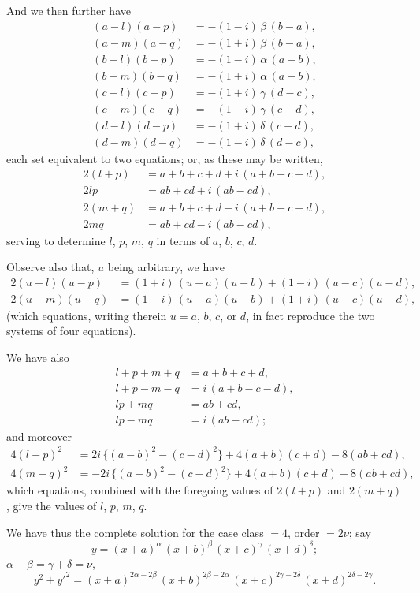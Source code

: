 \documentclass[12pt,a4paper]{article}
\theoremstyle{plain}
\begin{document}
And we then further have
\begin{align*}
(a - l)(a - p) &= -(1 - i)\,\beta\,(b - a), \\
(a - m)(a - q) &= -(1 + i)\,\beta\,(b - a), \\
(b - l)(b - p) &= -(1 - i)\,\alpha\,(a - b), \\
(b - m)(b - q) &= -(1 + i)\,\alpha\,(a - b), \\
(c - l)(c - p) &= -(1 + i)\,\gamma\,(d - c), \\
(c - m)(c - q) &= -(1 - i)\,\gamma\,(c - d), \\
(d - l)(d - p) &= -(1 + i)\,\delta\,(c - d), \\
(d - m)(d - q) &= -(1 - i)\,\delta\,(d - c),
\end{align*}
each set equivalent to two equations; or, as these may be written,
\begin{align*}
2(l + p) &= a + b + c + d + i\,(a + b - c - d), \\
2lp &= ab + cd + i\,(ab - cd), \\
2(m + q) &= a + b + c + d - i\,(a + b - c - d), \\
2mq &= ab + cd - i\,(ab - cd),
\end{align*}
serving to determine $l$, $p$, $m$, $q$ in terms of $a$, $b$, $c$, $d$.

Observe also that, $u$ being arbitrary, we have
\begin{align*}
2(u - l)(u - p) &= (1 + i)\,(u - a)(u - b) + (1 - i)\,(u - c)(u - d), \\
2(u - m)(u - q) &= (1 - i)\,(u - a)(u - b) + (1 + i)\,(u - c)(u - d),
\end{align*}
(which equations, writing therein $u = a$, $b$, $c$, or $d$, in fact reproduce the two systems of four equations).

We have also
\begin{align*}
l + p + m + q &= a + b + c + d, \\
l + p - m - q &= i\,(a + b - c - d), \\
lp + mq &= ab + cd, \\
lp - mq &= i\,(ab - cd);
\end{align*}
and moreover
\begin{align*}
4(l - p)^{2} &= 2i\,\{(a-b)^{2} - (c-d)^{2}\} + 4(a+b)(c+d) - 8(ab+cd), \\
4(m - q)^{2} &= -2i\,\{(a-b)^{2} - (c-d)^{2}\} + 4(a+b)(c+d) - 8(ab+cd),
\end{align*}
which equations, combined with the foregoing values of $2(l+p)$ and $2(m+q)$, give the values of $l$, $p$, $m$, $q$.

We have thus the complete solution for the case class $= 4$, order $= 2\nu$; say
\[
y = (x + a)^{\alpha}\,(x + b)^{\beta}\,(x + c)^{\gamma}\,(x + d)^{\delta};
\]
$\alpha + \beta = \gamma + \delta = \nu$,
\[
y^{2} + y'^{2} = (x + a)^{2\alpha - 2\beta}\,(x + b)^{2\beta - 2\alpha}\,(x + c)^{2\gamma - 2\delta}\,(x + d)^{2\delta - 2\gamma}.
\]
\end{document}
